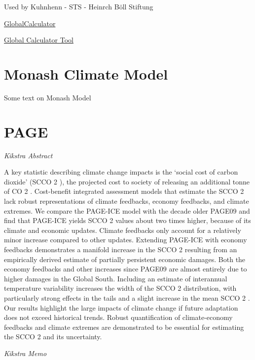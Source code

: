 \documentclass[
]{book}
\begin{document}
Used by Kuhnhenn - STS - Heinrch Böll Stiftung

\href{http://www.globalcalculator.org/}{GlobalCalculator}

\href{http://tool.globalcalculator.org/globcalc.html?levers=22rfoe2e\%2013be1111c2c2c1n31hfjdcef222hp233f211111fn2211111111/dashboard/en}{Global Calculator Tool}

\hypertarget{monash-climate-model}{%
\section{Monash Climate Model}\label{monash-climate-model}}

Some text on Monash Model

\hypertarget{page}{%
\section{PAGE}\label{page}}

\emph{Kikstra Abstract}

A key statistic describing climate change impacts is the `social cost of carbon dioxide' (SCCO 2 ), the
projected cost to society of releasing an additional tonne of CO 2 . Cost-benefit integrated
assessment models that estimate the SCCO 2 lack robust representations of climate feedbacks,
economy feedbacks, and climate extremes. We compare the PAGE-ICE model with the decade
older PAGE09 and find that PAGE-ICE yields SCCO 2 values about two times higher, because of its
climate and economic updates. Climate feedbacks only account for a relatively minor increase
compared to other updates. Extending PAGE-ICE with economy feedbacks demonstrates a
manifold increase in the SCCO 2 resulting from an empirically derived estimate of partially
persistent economic damages. Both the economy feedbacks and other increases since PAGE09 are
almost entirely due to higher damages in the Global South. Including an estimate of interannual
temperature variability increases the width of the SCCO 2 distribution, with particularly strong
effects in the tails and a slight increase in the mean SCCO 2 . Our results highlight the large impacts
of climate change if future adaptation does not exceed historical trends. Robust quantification of
climate-economy feedbacks and climate extremes are demonstrated to be essential for estimating
the SCCO 2 and its uncertainty.

\emph{Kikstra Memo}
\end{document}

